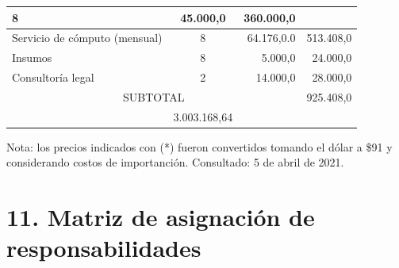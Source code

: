 \documentclass[11pt]{charter}
\begin{document}
\begin{table}[htpb]
\begin{tabularx}{\linewidth}{@{}|X|c|r|r|@{}}
8  & 45.000,0  & 360.000,0 \\ \hline
\multicolumn{1}{|l|}{Servicio de cómputo (mensual)	} &
8  & 64.176,0.0  & 513.408,0 \\ \hline
\multicolumn{1}{|l|}{Insumos} &
8  & 5.000,0  & 24.000,0 \\ \hline
\multicolumn{1}{|l|}{Consultoría legal} &
2  & 14.000,0  & 28.000,0 \\ \hline
\multicolumn{3}{|c|}{SUBTOTAL} & 
  \multicolumn{1}{c|}{925.408,0} \\ \hline
\rowcolor[HTML]{C0C0C0}
\multicolumn{3}{|c|}{TOTAL} &
3.003.168,64  \\ \hline
\end{tabularx}%
\end{table}

Nota: los precios indicados con (*) fueron convertidos tomando el dólar a \$91 y considerando costos de importanción. Consultado: 5 de abril de 2021.


\section{11. Matriz de asignación de responsabilidades}
\label{sec:responsabilidades}
\end{document}
